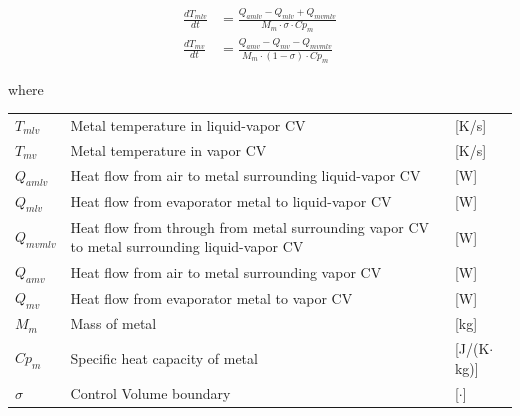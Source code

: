 
\begin{align}
	\frac{dT_{mlv}}{dt} & = \frac{Q_{amlv}-Q_{mlv} + Q_{mvmlv}}{M_m \cdot \sigma \cdot Cp_m}        \label{eq:evap_dT_ml} \\
	\frac{dT_{mv}}{dt} & = \frac{Q_{amv} - Q_{mv} - Q_{mvmlv}}{M_m \cdot (1 - \sigma) \cdot Cp_m } \label{eq:evap_dT_mv}
\end{align}

where

\begin{center}
	\begin{tabular}{l p{10cm} l}
		$T_{mlv} $  & Metal temperature in liquid-vapor CV                                                        & [\si{K}/\si{s}]                   \\%
		$T_{mv} $  & Metal temperature in vapor CV                                                               & [\si{K}/\si{s}]                   \\%
		$Q_{amlv}$  & Heat flow from air to metal surrounding liquid-vapor CV                                     & [\si{W}]                          \\
		$Q_{mlv}$   & Heat flow from evaporator metal to liquid-vapor CV                                          & [\si{W}]                          \\
		$Q_{mvmlv}$ & Heat flow from through from metal surrounding vapor CV to metal surrounding liquid-vapor CV & [\si{W}]                          \\
		$Q_{amv}$  & Heat flow from air to metal surrounding vapor CV                                            & [\si{W}]                          \\
		$Q_{mv}$   & Heat flow from evaporator metal to vapor CV                                                 & [\si{W}]                          \\
		$M_{m} $   & Mass of metal                                                                               & [\si{kg}]                         \\
		$Cp_{m}$   & Specific heat capacity of metal                                                             & [\si{J}/(\si{K}$ \cdot $\si{kg})] \\
		$\sigma$   & Control Volume boundary                                                                     & [$\cdot$]
	\end{tabular}
\end{center}

